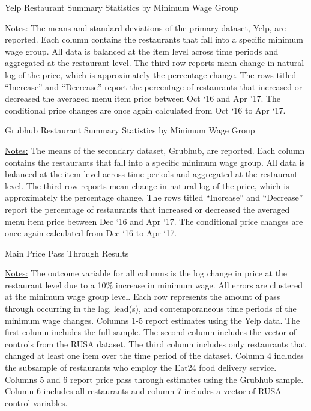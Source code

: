 \documentclass[11pt]{article}
\begin{document}
\begin{table}[p]
\centering
\caption{Yelp Restaurant Summary Statistics by Minimum Wage Group}

{\footnotesize \raggedright \underline{Notes:} The means and standard deviations of the primary dataset, Yelp, are reported. Each column contains the restaurants that fall into a specific minimum wage group. All data is balanced at the item level across time periods and aggregated at the restaurant level. The third row reports mean change in natural log of the price, which is approximately the percentage change. The rows titled ``Increase'' and ``Decrease'' report the percentage of restaurants that increased or decreased the averaged menu item price between Oct `16 and Apr '17. The conditional price changes are once again calculated from Oct `16 to Apr `17. \par }
\end{table}


\begin{table}[p]
\centering
\caption{Grubhub Restaurant Summary Statistics by Minimum Wage Group}

{\footnotesize \raggedright \underline{Notes:}  The means of the secondary dataset, Grubhub, are reported.  Each column contains the restaurants that fall into a specific minimum wage group. All data is balanced at the item level across time periods and aggregated at the restaurant level. The third row reports mean change in natural log of the price, which is approximately the percentage change. The rows titled ``Increase'' and ``Decrease'' report the percentage of restaurants that increased or decreased the averaged menu item price between Dec `16 and Apr `17. The conditional price changes are once again calculated from Dec `16 to Apr `17. \par
}
\end{table}


\begin{table}
\centering
\caption{Main Price Pass Through Results}


{\footnotesize \raggedright \underline{Notes:}  
The outcome variable for all columns is the log change in price at the restaurant level due to a 10\% increase in minimum wage. All errors are clustered at the minimum wage group level. Each row represents the amount of pass through occurring in the lag, lead(s), and contemporaneous time periods of the minimum wage changes. Columns 1-5 report estimates using the Yelp data. The first column includes the full sample. The second column includes the vector of controls from the RUSA dataset. The third column includes only restaurants that changed at least one item over the time period of the dataset. Column 4 includes the subsample of restaurants who employ the Eat24 food delivery service. Columns 5 and 6 report price pass through estimates using the Grubhub sample. Column 6 includes all restaurants and column 7 includes a vector of RUSA control variables.   \par
}
\end{table}
\end{document}
